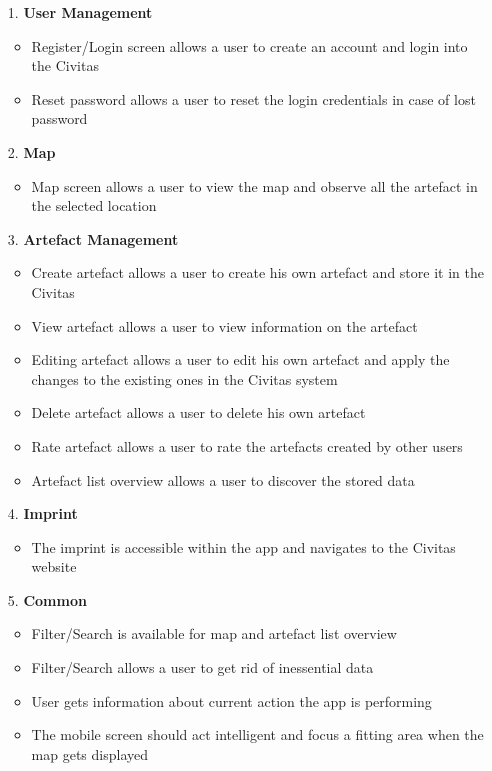 \begin{itemize}

\item[1.] \textbf{User Management}
	\begin{itemize}
	\item Register/Login screen allows a user to create an account and login into the Civitas
	\item Reset password allows a user to reset the login credentials in case of lost password
	\end{itemize}
	
\item[2.] \textbf{Map}
	\begin{itemize}
	\item Map screen allows a user to view the map and observe all the artefact in the selected location
	\end{itemize}
	
\item[3.] \textbf{Artefact Management}
	\begin{itemize}
	\item Create artefact allows a user to create his own artefact and store it in the Civitas
	\item View artefact allows a user to view information on the artefact 
	\item Editing artefact allows a user to edit his own artefact and apply the changes to the existing ones in the Civitas system
	\item Delete artefact allows a user to delete his own artefact
	\item Rate artefact allows a user to rate the artefacts created by other users
	\item Artefact list overview allows a user to discover the stored data
	\end{itemize}
	
\item[4.] \textbf{Imprint}
	\begin{itemize}
	\item The imprint is accessible within the app and navigates to the Civitas website
	\end{itemize}

\item[5.] \textbf{Common}
	\begin{itemize}
	\item Filter/Search is available for map and artefact list overview
	\item Filter/Search allows a user to get rid of inessential data
	\item User gets information about current action the app is performing
	\item The mobile screen should act intelligent and focus a fitting area when the map gets displayed
	\end{itemize}
	
\end{itemize}


